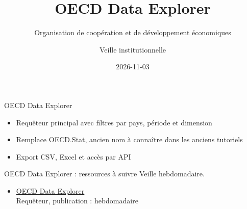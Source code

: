 \documentclass[aspectratio=169,11pt]{beamer}
\title{OECD Data Explorer}
\subtitle{Organisation de coopération et de développement économiques}
\author{Veille institutionnelle}
\date{2026-11-03}
\begin{document}
\begin{frame}\titlepage\end{frame}

\begin{frame}{OECD Data Explorer}
\begin{itemize}
\item Requêteur principal avec filtres par pays, période et dimension
\item Remplace OECD.Stat, ancien nom à connaître dans les anciens tutoriels
\item Export CSV, Excel et accès par API
\end{itemize}
\end{frame}

\begin{frame}{OECD Data Explorer : ressources à suivre}
\small
Veille hebdomadaire.
\begin{itemize}
\item \href{https://data-explorer.oecd.org}{OECD Data Explorer}\\{\footnotesize Requêteur, publication : hebdomadaire}
\end{itemize}
\end{frame}
\end{document}
